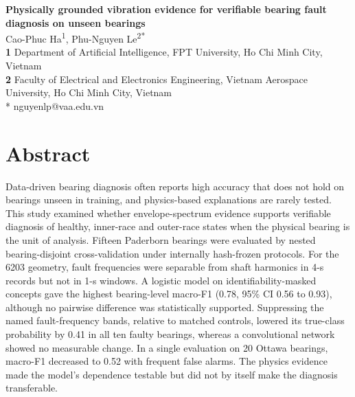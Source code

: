 \documentclass[10pt,letterpaper]{article}
\begin{document}
\vspace*{0.2in}

\begin{flushleft}
{\Large
\textbf{Physically grounded vibration evidence for verifiable bearing fault diagnosis on unseen bearings}
}
\newline
\\
Cao-Phuc Ha\textsuperscript{1},
Phu-Nguyen Le\textsuperscript{2*}
\\
\bigskip
\textbf{1} Department of Artificial Intelligence, FPT University, Ho Chi Minh City, Vietnam
\\
\textbf{2} Faculty of Electrical and Electronics Engineering, Vietnam Aerospace University, Ho Chi Minh City, Vietnam
\\
\bigskip
* nguyenlp@vaa.edu.vn
\end{flushleft}

\section*{Abstract}
Data-driven bearing diagnosis often reports high accuracy that does not hold on bearings unseen in training, and physics-based explanations are rarely tested. This study examined whether envelope-spectrum evidence supports verifiable diagnosis of healthy, inner-race and outer-race states when the physical bearing is the unit of analysis. Fifteen Paderborn bearings were evaluated by nested bearing-disjoint cross-validation under internally hash-frozen protocols. For the 6203 geometry, fault frequencies were separable from shaft harmonics in 4-s records but not in 1-s windows. A logistic model on identifiability-masked concepts gave the highest bearing-level macro-F1 (0.78, 95\% CI 0.56 to 0.93), although no pairwise difference was statistically supported. Suppressing the named fault-frequency bands, relative to matched controls, lowered its true-class probability by 0.41 in all ten faulty bearings, whereas a convolutional network showed no measurable change. In a single evaluation on 20 Ottawa bearings, macro-F1 decreased to 0.52 with frequent false alarms. The physics evidence made the model's dependence testable but did not by itself make the diagnosis transferable.

\clearpage
{}
\linenumbers
\end{document}
